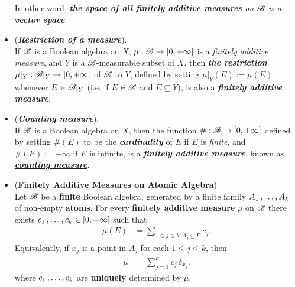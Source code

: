 \documentclass[11pt]{article}
\begin{document}
\begin{itemize}
\begin{example}
In other word, \underline{\emph{\textbf{the space of all finitely additive measures} on ${\mathscr B}$ is a \textbf{vector space}}}.
\end{example}

\item \begin{example} (\emph{\textbf{Restriction of a measure}}).\\
If ${\mathscr B}$ is a Boolean algebra on $X$, $\mu: {\mathscr B} \rightarrow [0, +\infty]$ is a \emph{finitely additive measure}, and $Y$ is a ${\mathscr B}$-measurable subset of $X$, then \emph{\textbf{the restriction}} $\mu|_{Y}: {\mathscr B}|_{Y}  \rightarrow [0, +\infty]$ of ${\mathscr B}$ to $Y$, defined by setting $\mu|_{Y}(E) := \mu(E)$ whenever $E \in {\mathscr B}|_{Y}$ (i.e.
if $E \in {\mathscr B}$ and $E \subseteq Y$), is also a \emph{\textbf{finitely additive measure}}.
\end{example}

\item \begin{example} (\emph{\textbf{Counting measure}}).\\
If ${\mathscr B}$ is a Boolean algebra on $X$, then the function $\#: {\mathscr B} \rightarrow [0, +\infty]$ defined by setting $\#(E)$ to be the \emph{\textbf{cardinality}} of $E$ if $E$ is \textit{finite}, and $\#(E) := +\infty$ if $E$ is infinite, is a \emph{\textbf{finitely additive measure}}, known as \underline{\emph{\textbf{counting measure}}}.
\end{example}

\item \begin{proposition} (\textbf{Finitely Additive Measures on Atomic Algebra})\\
Let ${\mathscr B}$ be a \textbf{finite} Boolean algebra, generated by a finite family $A_1 \,{,}\ldots{,}\, A_k$ of non-empty \textbf{atoms}. For every \textbf{finitely additive measure} $\mu$ on ${\mathscr B}$ there exists $c_1 \,{,}\ldots{,}\, c_k \in [0, +\infty]$ such that
\begin{align*}
\mu(E) &= \sum_{1 \le j \le k: A_j \subseteq E} c_j.
\end{align*}
Equivalently, if $x_j$ is a point in $A_j$ for each $1 \le j \le k$, then
\begin{align*}
\mu &= \sum_{j=1}^{k}c_j\,\delta_{x_j}. 
\end{align*}
where $c_1 \,{,}\ldots{,}\, c_k$ are \textbf{uniquely} determined by $\mu$.
\end{proposition}
\end{itemize}
\end{document}
